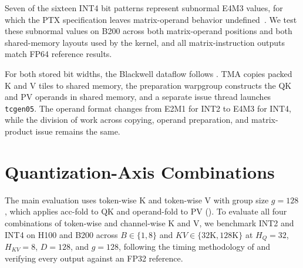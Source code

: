 Seven of the sixteen INT4 bit patterns represent subnormal E4M3 values, for which the PTX specification leaves matrix-operand behavior undefined~\cite{nvidia2026ptx}.
We test these subnormal values on B200 across both matrix-operand positions and both shared-memory layouts used by the kernel, and all matrix-instruction outputs match FP64 reference results.

For both stored bit widths, the Blackwell dataflow follows .
TMA copies packed K and V tiles to shared memory, the preparation warpgroup constructs the QK and PV operands in shared memory, and a separate issue thread launches \texttt{tcgen05}.
The operand format changes from E2M1 for INT2 to E4M3 for INT4, while the division of work across copying, operand preparation, and matrix-product issue remains the same.

\section{Quantization-Axis Combinations}
\label{sec:appendix-axes}



The main evaluation uses token-wise K and token-wise V with group size $g=128$, which applies acc-fold to QK and operand-fold to PV ().
To evaluate all four combinations of token-wise and channel-wise K and V, we benchmark \sys{} INT2 and INT4 on H100 and B200 across $B\in\{1,8\}$ and $KV\in\{32\mathrm{K},128\mathrm{K}\}$ at $H_Q=32$, $H_{KV}=8$, $D=128$, and $g=128$, following the timing methodology of  and verifying every output against an FP32 reference.

